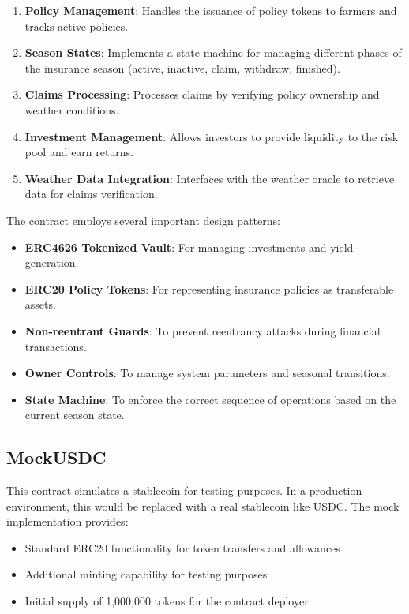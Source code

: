 \documentclass[11pt,a4paper]{article}
\begin{document}
		\begin{enumerate}
			\item \textbf{Policy Management}: Handles the issuance of policy tokens to farmers and tracks active policies.
			\item \textbf{Season States}: Implements a state machine for managing different phases of the insurance season (active, inactive, claim, withdraw, finished).
			\item \textbf{Claims Processing}: Processes claims by verifying policy ownership and weather conditions.
			\item \textbf{Investment Management}: Allows investors to provide liquidity to the risk pool and earn returns.
			\item \textbf{Weather Data Integration}: Interfaces with the weather oracle to retrieve data for claims verification.
		\end{enumerate}

		The contract employs several important design patterns:
		\begin{itemize}
			\item \textbf{ERC4626 Tokenized Vault}: For managing investments and yield generation.
			\item \textbf{ERC20 Policy Tokens}: For representing insurance policies as transferable assets.
			\item \textbf{Non-reentrant Guards}: To prevent reentrancy attacks during financial transactions.
			\item \textbf{Owner Controls}: To manage system parameters and seasonal transitions.
			\item \textbf{State Machine}: To enforce the correct sequence of operations based on the current season state.
		\end{itemize}

		\subsection{MockUSDC}\label{subsec:analysis-mock-usdc}
		This contract simulates a stablecoin for testing purposes.
		In a production environment, this would be replaced with a real stablecoin like USDC. The mock implementation provides:

		\begin{itemize}
			\item Standard ERC20 functionality for token transfers and allowances
			\item Additional minting capability for testing purposes
			\item Initial supply of 1,000,000 tokens for the contract deployer
		\end{itemize}
\end{document}
